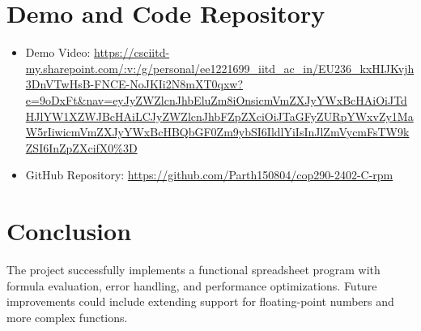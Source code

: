 \documentclass[a4paper,12pt]{article}
\begin{document}
\section{Demo and Code Repository}
\begin{itemize}
    \item Demo Video: \url{https://csciitd-my.sharepoint.com/:v:/g/personal/ee1221699_iitd_ac_in/EU236_kxHIJKvjh3DnVTwHsB-FNCE-NoJKIi2N8mXT0qxw?e=9oDxFt&nav=eyJyZWZlcnJhbEluZm8iOnsicmVmZXJyYWxBcHAiOiJTdHJlYW1XZWJBcHAiLCJyZWZlcnJhbFZpZXciOiJTaGFyZURpYWxvZy1MaW5rIiwicmVmZXJyYWxBcHBQbGF0Zm9ybSI6IldlYiIsInJlZmVycmFsTW9kZSI6InZpZXcifX0%3D}
    \item GitHub Repository: \url{https://github.com/Parth150804/cop290-2402-C-rpm}
\end{itemize}

\section{Conclusion}
The project successfully implements a functional spreadsheet program with formula evaluation, error handling, and performance optimizations. Future improvements could include extending support for floating-point numbers and more complex functions.
\end{document}
